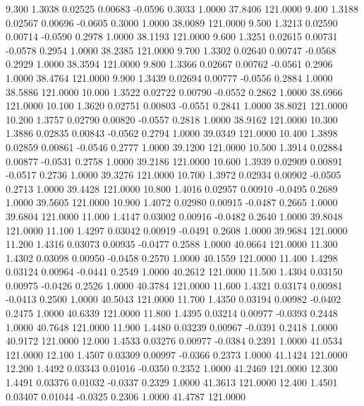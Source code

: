    9.300   1.3038   0.02525   0.00683  -0.0596   0.3033   1.0000  37.8406 121.0000
   9.400   1.3188   0.02567   0.00696  -0.0605   0.3000   1.0000  38.0089 121.0000
   9.500   1.3213   0.02590   0.00714  -0.0590   0.2978   1.0000  38.1193 121.0000
   9.600   1.3251   0.02615   0.00731  -0.0578   0.2954   1.0000  38.2385 121.0000
   9.700   1.3302   0.02640   0.00747  -0.0568   0.2929   1.0000  38.3594 121.0000
   9.800   1.3366   0.02667   0.00762  -0.0561   0.2906   1.0000  38.4764 121.0000
   9.900   1.3439   0.02694   0.00777  -0.0556   0.2884   1.0000  38.5886 121.0000
  10.000   1.3522   0.02722   0.00790  -0.0552   0.2862   1.0000  38.6966 121.0000
  10.100   1.3620   0.02751   0.00803  -0.0551   0.2841   1.0000  38.8021 121.0000
  10.200   1.3757   0.02790   0.00820  -0.0557   0.2818   1.0000  38.9162 121.0000
  10.300   1.3886   0.02835   0.00843  -0.0562   0.2794   1.0000  39.0349 121.0000
  10.400   1.3898   0.02859   0.00861  -0.0546   0.2777   1.0000  39.1200 121.0000
  10.500   1.3914   0.02884   0.00877  -0.0531   0.2758   1.0000  39.2186 121.0000
  10.600   1.3939   0.02909   0.00891  -0.0517   0.2736   1.0000  39.3276 121.0000
  10.700   1.3972   0.02934   0.00902  -0.0505   0.2713   1.0000  39.4428 121.0000
  10.800   1.4016   0.02957   0.00910  -0.0495   0.2689   1.0000  39.5605 121.0000
  10.900   1.4072   0.02980   0.00915  -0.0487   0.2665   1.0000  39.6804 121.0000
  11.000   1.4147   0.03002   0.00916  -0.0482   0.2640   1.0000  39.8048 121.0000
  11.100   1.4297   0.03042   0.00919  -0.0491   0.2608   1.0000  39.9684 121.0000
  11.200   1.4316   0.03073   0.00935  -0.0477   0.2588   1.0000  40.0664 121.0000
  11.300   1.4302   0.03098   0.00950  -0.0458   0.2570   1.0000  40.1559 121.0000
  11.400   1.4298   0.03124   0.00964  -0.0441   0.2549   1.0000  40.2612 121.0000
  11.500   1.4304   0.03150   0.00975  -0.0426   0.2526   1.0000  40.3784 121.0000
  11.600   1.4321   0.03174   0.00981  -0.0413   0.2500   1.0000  40.5043 121.0000
  11.700   1.4350   0.03194   0.00982  -0.0402   0.2475   1.0000  40.6339 121.0000
  11.800   1.4395   0.03214   0.00977  -0.0393   0.2448   1.0000  40.7648 121.0000
  11.900   1.4480   0.03239   0.00967  -0.0391   0.2418   1.0000  40.9172 121.0000
  12.000   1.4533   0.03276   0.00977  -0.0384   0.2391   1.0000  41.0534 121.0000
  12.100   1.4507   0.03309   0.00997  -0.0366   0.2373   1.0000  41.1424 121.0000
  12.200   1.4492   0.03343   0.01016  -0.0350   0.2352   1.0000  41.2469 121.0000
  12.300   1.4491   0.03376   0.01032  -0.0337   0.2329   1.0000  41.3613 121.0000
  12.400   1.4501   0.03407   0.01044  -0.0325   0.2306   1.0000  41.4787 121.0000
